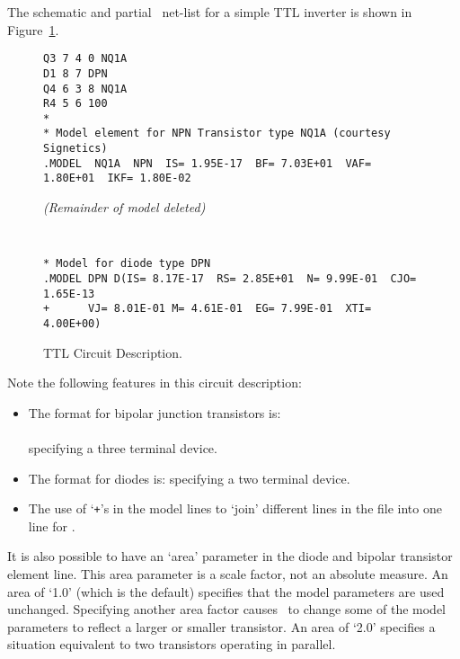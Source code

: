 The schematic and partial \spice\ net-list for a simple TTL inverter
is shown in Figure~\ref{ttl}.
%
\begin{figure}
\centerline{\epsfysize=8.7cm}
\par\noindent
{\tt\begin{verbatim}
Q3 7 4 0 NQ1A
D1 8 7 DPN
Q4 6 3 8 NQ1A
R4 5 6 100
*
* Model element for NPN Transistor type NQ1A (courtesy Signetics)
.MODEL  NQ1A  NPN  IS= 1.95E-17  BF= 7.03E+01  VAF= 1.80E+01  IKF= 1.80E-02
\end{verbatim} }
\par\noindent
{\em (Remainder of model deleted)}
\par\noindent
{\tt
\begin{verbatim}
* Model for diode type DPN
.MODEL DPN D(IS= 8.17E-17  RS= 2.85E+01  N= 9.99E-01  CJO= 1.65E-13
+      VJ= 8.01E-01 M= 4.61E-01  EG= 7.99E-01  XTI= 4.00E+00)
\end{verbatim} }
\caption{TTL Circuit Description.}
\label{ttl}
\end{figure}
%
Note the following features in this circuit description:
\begin{itemize}
  \item The format for bipolar junction  transistors is:\\
  \\
specifying a three terminal device.
  \item The format for diodes is:
specifying a two terminal device.
  \item The use of `{\tt +}'s in the model lines to `join' different
lines in the file into one line for \spice.
\end{itemize}
It is also possible to have an `area' parameter in the diode and bipolar
transistor element line.  This area parameter is a scale factor, not
an absolute measure. An area of `1.0' (which is the default) specifies
that the model parameters are used unchanged.
Specifying another area factor causes
\spice\ to change some of the model parameters to reflect a larger or
smaller transistor.  An area of `2.0' specifies a situation equivalent
to  two transistors operating in parallel.

